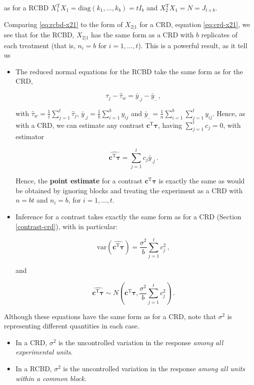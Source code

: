 \documentclass[
]{book}
\theoremstyle{definition}
\theoremstyle{definition}
\theoremstyle{definition}
\theoremstyle{definition}
\theoremstyle{remark}
\begin{document}
as for a RCBD \(X_1^{\mathrm{T}}X_1 = \mathrm{diag}(k_1,\ldots, k_b) = tI_b\) and \(X_2^{\mathrm{T}}X_1 = N = J_{t\times b}\).

Comparing \eqref{eq:rcbd-x21} to the form of \(X_{2|1}\) for a CRD, equation \eqref{eq:crd-x21}, we see that for the RCBD, \(X_{2|1}\) has the same form as a CRD with \(b\) replicates of each treatment (that is, \(n_i = b\) for \(i=1,\ldots, t\)). This is a powerful result, as it tell us

\begin{itemize}
\item
  The reduced normal equations for the RCBD take the same form as for the CRD,

  \[
    \hat{\tau}_j - \hat{\tau}_w = \bar{y}_{.j} - \bar{y}_{..}\,,
  \]

  with \(\hat{\tau}_w = \frac{1}{t}\sum_{j=1}^t\hat{\tau}_j\), \(\bar{y}_{.j} = \frac{1}{b}\sum_{i=1}^b y_{ij}\) and \(\bar{y}_{..} = \frac{1}{n}\sum_{i=1}^b\sum_{j=1}^t y_{ij}\). Hence, as with a CRD, we can estimate any contrast \(\boldsymbol{c}^{\mathrm{T}}\boldsymbol{\tau}\), having \(\sum_{j=1}^tc_j = 0\), with estimator

  \[
  \widehat{\boldsymbol{c}^{\mathrm{T}}\boldsymbol{\tau}} = \sum_{j=1}^tc_j\bar{y}_{.j}\,.
  \]

  Hence, the \textbf{point estimate} for a contrast \(\boldsymbol{c}^{\mathrm{T}}\boldsymbol{\tau}\) is exactly the same as would be obtained by ignoring blocks and treating the experiment as a CRD with \(n = bt\) and \(n_i = b\), for \(i=1,\ldots, t\).
\item
  Inference for a contrast takes exactly the same form as for a CRD (Section \ref{contrast-crd}), with in particular:

  \[
  \mathrm{var}\left(\widehat{\boldsymbol{c}^{\mathrm{T}}\boldsymbol{\tau}}\right) = \frac{\sigma^2}{b}\sum_{j=1}^tc_j^2\,,
  \]

  and

  \[
    \widehat{\boldsymbol{c}^{\mathrm{T}}\boldsymbol{\tau}} \sim N\left(\boldsymbol{c}^{\mathrm{T}}\boldsymbol{\tau}, \frac{\sigma^2}{b}\sum_{j=1}^t c_j^2\right)\,.
  \]
\end{itemize}

Although these equations have the same form as for a CRD, note that \(\sigma^2\) is representing different quantities in each case.

\begin{itemize}
\item
  In a CRD, \(\sigma^2\) is the uncontrolled variation in the response \emph{among all experimental units}.
\item
  In a RCBD, \(\sigma^2\) is the uncontrolled variation in the response \emph{among all units within a common block}.
\end{itemize}
\end{document}
